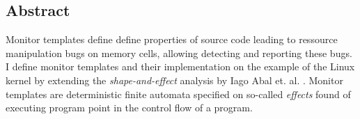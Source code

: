 \subsection*{Abstract}

Monitor templates define define properties of source code leading to ressource manipulation bugs on memory cells, allowing detecting and reporting these bugs. I define monitor templates and their implementation on the example of the Linux kernel by extending the \textit{shape-and-effect} analysis by Iago Abal et. al. \cite{Abal2017EffectiveBF}.
Monitor templates are deterministic finite automata specified on so-called \textit{effects} found of executing program point in the control flow of a program. 